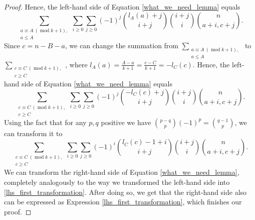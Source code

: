\documentclass[10pt,a4paper]{amsart}
\newcommand\modd{\operatorname{mod}}
\begin{document}
\begin{proof}
    Hence, the left-hand side of Equation \ref{what_we_need_lemma} equals
    \begin{equation}
    \label{lhs_first_transformation}
        \sum_{\substack{a \equiv A \ (\modd k+1), \\ a \leqslant A}} \sum_{i \geqslant 0} \sum_{j \geqslant 0}  (-1)^j \binom{l_A(a)+j}{i + j}\binom{i+j}{i}\binom{n}{a+i, c+j}.
    \end{equation}
    Since $c=n-B-a$, we can change the summation from $\sum_{\substack{a \equiv A \ (\modd k+1), \\ a \leqslant A}}$ to $\sum_{\substack{c \equiv C \ (\modd k+1), \\ c \geqslant C}}$, where $l_A(a)=\frac{A-a}{k+1}=\frac{c-C}{k+1}=-l_C(c)$. Hence, the left-hand side of Equation \ref{what_we_need_lemma} equals
    \begin{equation*}
        \sum_{\substack{c \equiv C \ (\modd k+1), \\ c \geqslant C}} \sum_{i \geqslant 0} \sum_{j \geqslant 0} (-1)^j \binom{-l_C(c)+j}{i+j}\binom{i+j}{i}\binom{n}{a+i, c+j}.
    \end{equation*}
    Using the fact that for any $p, q$ positive we have $\binom{p-q}{p}(-1)^p=\binom{q-1}{p}$, we can transform it to
    \begin{equation}
    \label{expression_lhs}
        \sum_{\substack{c \equiv C \ (\modd k+1), \\ c \geqslant C}} \sum_{i \geqslant 0} \sum_{j \geqslant 0} (-1)^i \binom{l_C(c)-1+i}{i+j}\binom{i+j}{i}\binom{n}{a+i, c+j}.
    \end{equation}
    We can transform the right-hand side of Equation \ref{what_we_need_lemma}, completely analogously to the way we transformed the left-hand side into \ref{lhs_first_transformation}. After doing so, we get that the right-hand side also can be expressed as Expression \ref{lhs_first_transformation}, which finishes our proof.
\end{proof}
\end{document}
